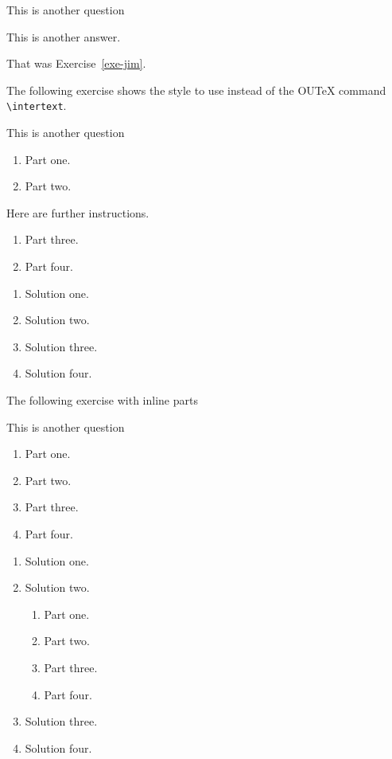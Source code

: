 \documentclass[solutionsatend,twocolumnsolutions]{ouunit}
\begin{document}
\begin{exercise}\label{exe-jim}
This is another question
\begin{solution}
This is another answer.
\end{solution}
\end{exercise}
That was Exercise~\ref{exe-jim}. 


The following exercise shows the style to use instead of the OUTeX command \verb”\intertext”.
\begin{exercise}\label{exe-intertext}
This is another question
\begin{enumerate}
\item Part one.
\item Part two.
\end{enumerate}
Here are further instructions.
\begin{enumerate}[resume]
\item Part three.
\item Part four.
\end{enumerate}
\begin{solution}
\begin{enumerate}
\item Solution one.
\item Solution two.
\item Solution three.
\item Solution four.
\end{enumerate}
\end{solution}
\end{exercise}
The following exercise with inline parts
\begin{exercise}\label{exe-intertext2}
This is another question
\begin{enumerate}
\item Part one.
\item Part two.
\item Part three.
\item Part four.
\end{enumerate}
\begin{solution}
\begin{enumerate}
\item Solution one.
\item Solution two.
\begin{enumerate}
\item Part one.
\item Part two.
\item Part three.
\item Part four.
\end{enumerate}
\item Solution three.
\item Solution four.
\end{enumerate}
\end{solution}
\end{exercise}
\end{document}
